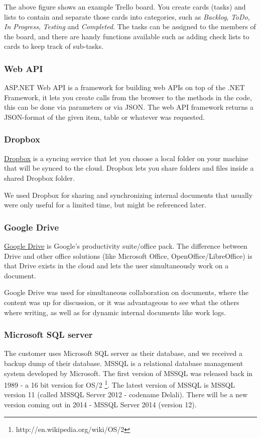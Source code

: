 The above figure shows an example Trello board. You create cards (tasks) and lists to contain and separate those cards into categories, such as \emph{Backlog}, \emph{ToDo}, \emph{In Progress}, \emph{Testing} and \emph{Completed}. The tasks can be assigned to the members of the board, and there are handy functions available such as adding check lists to cards to keep track of sub-tasks.

\subsubsection{Web API}

ASP.NET Web API is a framework for building web APIs on top of the .NET Framework, it lets you create calls from the browser to the methods in the code, this can be done via parameters or via JSON. The web API framework returns a JSON-format of the given item, table or whatever was requested.

\subsubsection{Dropbox}
\href{http://www.dropbox.com}{Dropbox} is a syncing service that let you choose a local folder on your machine that will be synced to the cloud. Dropbox lets you share folders and files inside a shared Dropbox folder.

We used Dropbox for sharing and synchronizing internal documents that usually were only useful for a limited time, but might be referenced later.

\subsubsection{Google Drive}
\href{https://drive.google.com/}{Google Drive} is Google's productivity suite/office pack. The difference between Drive and other office solutions (like Microsoft Office, OpenOffice/LibreOffice) is that Drive exists in the cloud and lets the user simultaneously work on a document.

Google Drive was used for simultaneous collaboration on documents, where the content was up for discussion, or it was advantageous to see what the others where writing, as well as for dynamic internal documents like work logs.

\subsubsection{Microsoft SQL server}
The customer uses Microsoft SQL server as their database, and we received a backup dump of their database. MSSQL is a relational database management system developed by Microsoft. The first version of MSSQL was released back in 1989 - a 16 bit version for OS/2 \footnote{http://en.wikipedia.org/wiki/OS/2}. The latest version of MSSQL is MSSQL version 11 (called MSSQL Server 2012 - codename Delali). There will be a new version coming out in 2014 - MSSQL Server 2014 (version 12).

